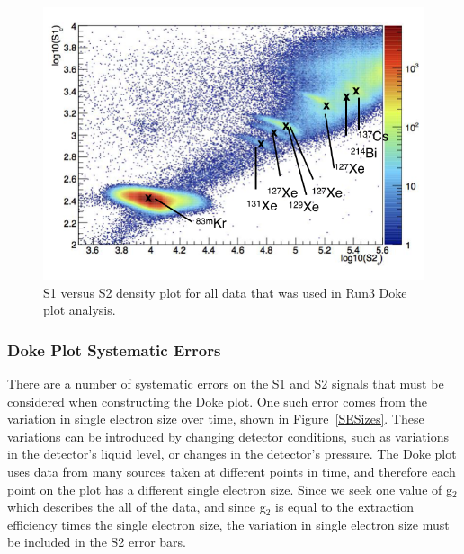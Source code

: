 \begin{figure}[H]
\centering
\includegraphics[scale=1]{Monoenergetic_gamma_sources.png}
\caption{S1 versus S2 density plot for all data that was used in Run3 Doke plot analysis.}
\label{alleventselection}
\end{figure}


\subsubsection{Doke Plot Systematic Errors}

There are a number of systematic errors on the S1 and S2 signals that must be considered when constructing the Doke plot.  One such error comes from the variation in single electron size over time, shown in Figure~\ref{SESizes}. These variations can be introduced by changing detector conditions, such as variations in the detector's liquid level, or changes in the detector's pressure.  The Doke plot uses data from many sources taken at different points in time, and therefore each point on the plot has a different single electron size.  Since we seek one value of g$_2$ which describes the all of the data, and since g$_2$ is equal to the extraction efficiency times the single electron size, the variation in single electron size must be included in the S2 error bars.


